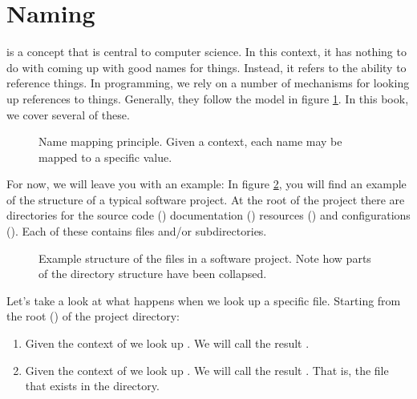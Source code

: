 \section{Naming}

 is a concept that is central to computer science. In this context, it has nothing to do with coming up with good names for things. Instead, it refers to the ability to reference things. In programming, we rely on a number of mechanisms for looking up references to things. Generally, they follow the model in figure \ref{fig:bg:naming:concept}. In this book, we cover several of these.

\begin{figure}[tbp]
  
  \caption[Name mapping principle]{Name mapping principle. Given a context, each name may be mapped to a specific value.}
  \label{fig:bg:naming:concept}
\end{figure}

For now, we will leave you with an example: In figure \ref{fig:bg:naming:example}, you will find an example of the structure of a typical software project. At the root of the project there are directories for the source code () documentation () resources () and configurations (). Each of these contains files and/or subdirectories.

\begin{figure}[tbp]
  
  \caption[Example structure of the files in a software project]{Example structure of the files in a software project. Note how parts of the directory structure have been collapsed.}
  \label{fig:bg:naming:example}
\end{figure}

Let's take a look at what happens when we look up a specific file. Starting from the root (\filename{/}) of the project directory:
\begin{enumerate}
  \item Given the context of \filename{/} we look up . We will call the result .
  \item Given the context of  we look up . We will call the result . That is, the  file that exists in the   directory.
\end{enumerate}

